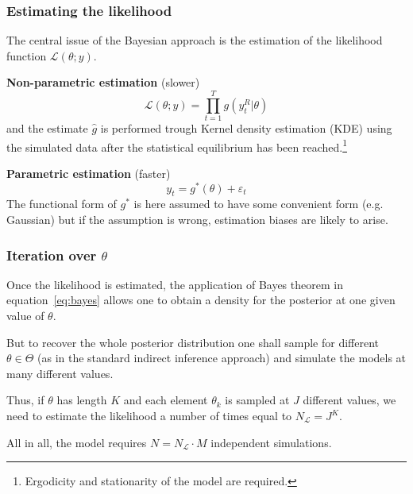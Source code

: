 \documentclass[10pt]{beamer}
\begin{document}
\begin{frame}[c]\frametitle{Estimating the likelihood}
    The central issue of the Bayesian approach is the estimation of the likelihood function $\mathcal{L}(\theta; y)$. \bigskip

    \alert{\textbf{Non-parametric estimation} (slower)}
    \begin{equation*}
    	\mathcal{L}(\theta; y) = \prod_{t=1}^{T} g(y_{t}^{R} | \theta)
    \end{equation*}
    and the estimate $\hat{g}$ is performed trough Kernel density estimation (KDE) using the simulated data after the statistical equilibrium has been reached.\footnote{Ergodicity and stationarity of the model are required.} \bigskip

    \alert{\textbf{Parametric estimation} (faster)}
    \begin{equation*}
    	y_{t} = g^{*}(\theta) + \varepsilon_{t}
    \end{equation*}
    The functional form of $g^{*}$ is here assumed to have some convenient form (e.g. Gaussian) but if the assumption is wrong, estimation biases are likely to arise. \bigskip
\end{frame}


\begin{frame}[c]\frametitle{Iteration over $\theta$}
	Once the likelihood is estimated, the application of Bayes theorem in equation~\ref{eq:bayes} allows one to obtain a density for the posterior at one given value of $\theta$. \bigskip

	But to recover the whole posterior distribution one shall sample for different $\theta \in \Theta$ (as in the standard indirect inference approach) and simulate the models at many different values.\bigskip

	Thus, if $\theta$ has length $K$ and each element $\theta_{k}$ is sampled at $J$ different values, we need to estimate the likelihood a number of times equal to $N_{\mathcal{L}} = J^K$. \bigskip

	All in all, the model requires $N = N_{\mathcal{L}} \cdot M$ independent simulations.
\end{frame}


\end{document}
